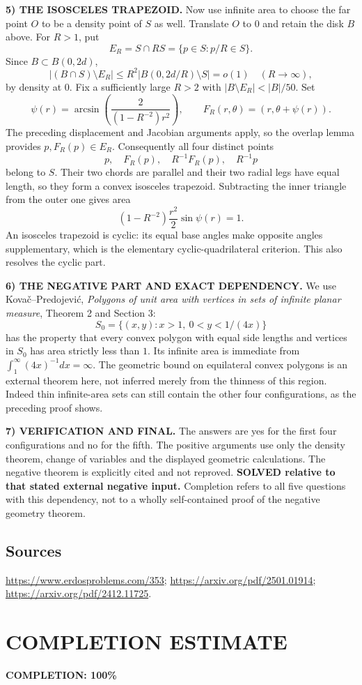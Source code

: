 \noindent\textbf{5) THE ISOSCELES TRAPEZOID.}
Now use infinite area to choose the far point $O$ to be a density point of $S$ as well. Translate $O$ to $0$ and retain the disk $B$ above. For $R>1$, put
\[
 E_R=S\cap RS=\{p\in S:p/R\in S\}.
\]
Since $B\subset B(0,2d)$,
\[
 |(B\cap S)\setminus E_R|
 \le R^2|B(0,2d/R)\setminus S|=o(1)
 \quad(R\to\infty),
\]
by density at $0$. Fix a sufficiently large $R>2$ with
$|B\setminus E_R|<|B|/50$. Set
\[
 \psi(r)=\arcsin\left(\frac{2}{(1-R^{-2})r^2}\right),
 \qquad F_R(r,\theta)=(r,\theta+\psi(r)).
\]
The preceding displacement and Jacobian arguments apply, so the overlap lemma provides $p,F_R(p)\in E_R$. Consequently all four distinct points
\[
 p,\quad F_R(p),\quad R^{-1}F_R(p),\quad R^{-1}p
\]
belong to $S$. Their two chords are parallel and their two radial legs have equal length, so they form a convex isosceles trapezoid. Subtracting the inner triangle from the outer one gives area
\[
 (1-R^{-2})\frac{r^2}2\sin\psi(r)=1.
\]
An isosceles trapezoid is cyclic: its equal base angles make opposite angles supplementary, which is the elementary cyclic-quadrilateral criterion. This also resolves the cyclic part.

\noindent\textbf{6) THE NEGATIVE PART AND EXACT DEPENDENCY.}
We use Kova\v{c}--Predojevi\'{c}, \emph{Polygons of unit area with vertices in sets of infinite planar measure}, Theorem 2 and Section 3:
\[
 S_0=\{(x,y):x>1,\ 0<y<1/(4x)\}
\]
has the property that every convex polygon with equal side lengths and vertices in $S_0$ has area strictly less than $1$. Its infinite area is immediate from $\int_1^\infty(4x)^{-1}dx=\infty$. The geometric bound on equilateral convex polygons is an external theorem here, not inferred merely from the thinness of this region. Indeed thin infinite-area sets can still contain the other four configurations, as the preceding proof shows.

\noindent\textbf{7) VERIFICATION AND FINAL.}
The answers are yes for the first four configurations and no for the fifth. The positive arguments use only the density theorem, change of variables and the displayed geometric calculations. The negative theorem is explicitly cited and not reproved. \textbf{SOLVED relative to that stated external negative input.} Completion refers to all five questions with this dependency, not to a wholly self-contained proof of the negative geometry theorem.

\subsection*{Sources}
\url{https://www.erdosproblems.com/353}; \url{https://arxiv.org/pdf/2501.01914}; \url{https://arxiv.org/pdf/2412.11725}.

\section{COMPLETION ESTIMATE}
\textbf{COMPLETION: 100\%}
